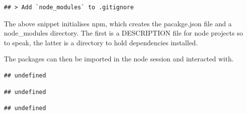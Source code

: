 \documentclass[
]{krantz}
\makeatletter
\newenvironment{Shaded}{\begin{snugshade}}{\end{snugshade}}
\newcommand{\KeywordTok}[1]{\textcolor[rgb]{0.27,0.27,0.27}{\textbf{#1}}}
\newcommand{\NormalTok}[1]{#1}
\newcommand{\OperatorTok}[1]{\textcolor[rgb]{0.43,0.43,0.43}{\textbf{#1}}}
\newcommand{\StringTok}[1]{\textcolor[rgb]{0.5,0.5,0.5}{#1}}
\newenvironment{kframe}{%
\medskip{}
\setlength{\fboxsep}{.8em}
 \def\at@end@of@kframe{}%
 \ifinner\ifhmode%
  \def\at@end@of@kframe{\end{minipage}}%
  \begin{minipage}{\columnwidth}%
 \fi\fi%
 \def\FrameCommand##1{\hskip\@totalleftmargin \hskip-\fboxsep
 \colorbox{shadecolor}{##1}\hskip-\fboxsep
     \hskip-\linewidth \hskip-\@totalleftmargin \hskip\columnwidth}%
 \MakeFramed {\advance\hsize-\width
   \@totalleftmargin\z@ \linewidth\hsize
   \@setminipage}}%
 {\par\unskip\endMakeFramed%
 \at@end@of@kframe}
\renewenvironment{Shaded}{\begin{kframe}}{\end{kframe}}
\makeatother
\begin{document}
\begin{verbatim}
## > Add `node_modules` to .gitignore
\end{verbatim}

The above snippet initialises npm, which creates the pacakge.json file and a node\_modules directory. The first is a DESCRIPTION file for node projects so to speak, the latter is a directory to hold dependencies installed.

The packages can then be imported in the node session and interacted with.

\begin{Shaded}
\end{Shaded}

\begin{verbatim}
## undefined
\end{verbatim}

\begin{Shaded}
\end{Shaded}

\begin{verbatim}
## undefined
\end{verbatim}

\begin{Shaded}
\end{Shaded}

\begin{verbatim}
## undefined
\end{verbatim}

\begin{Shaded}
\end{Shaded}
\end{document}

